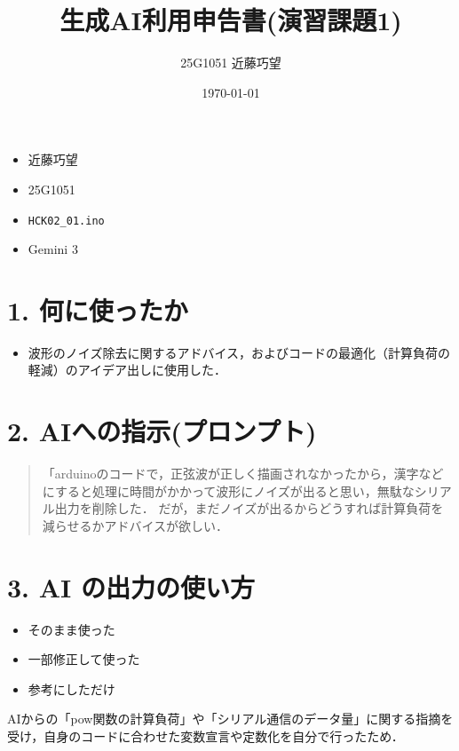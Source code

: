 \documentclass[uplatex,dvipdfmx]{jsarticle}
\title{生成AI利用申告書(演習課題1)}
\author{25G1051 近藤巧望}
\date{\today}
\begin{document}
\maketitle

\begin{itemize}[label=--]
    \item {} 近藤巧望
    \item {} 25G1051
    \item {} \texttt{HCK02\_01.ino}
    \item {} Gemini 3
\end{itemize}

\section*{1. 何に使ったか} 

\begin{itemize}
    \item 波形のノイズ除去に関するアドバイス，およびコードの最適化（計算負荷の軽減）のアイデア出しに使用した． %
\end{itemize}

\section*{2. AIへの指示(プロンプト)} 
\begin{quote}
    「arduinoのコードで，正弦波が正しく描画されなかったから，漢字などにすると処理に時間がかかって波形にノイズが出ると思い，無駄なシリアル出力を削除した．
    だが，まだノイズが出るからどうすれば計算負荷を減らせるかアドバイスが欲しい．
\end{quote}

\section*{3. AI の出力の使い方} 
\begin{itemize}
    \item [$\square$] そのまま使った %
    \item [\rlap{$\square$}\raisebox{.15ex}{\hspace{0.1em}$\checkmark$}] 一部修正して使った %
    \item [$\square$] 参考にしただけ %
\end{itemize}
AIからの「pow関数の計算負荷」や「シリアル通信のデータ量」に関する指摘を受け，自身のコードに合わせた変数宣言や定数化を自分で行ったため．
\end{document}
